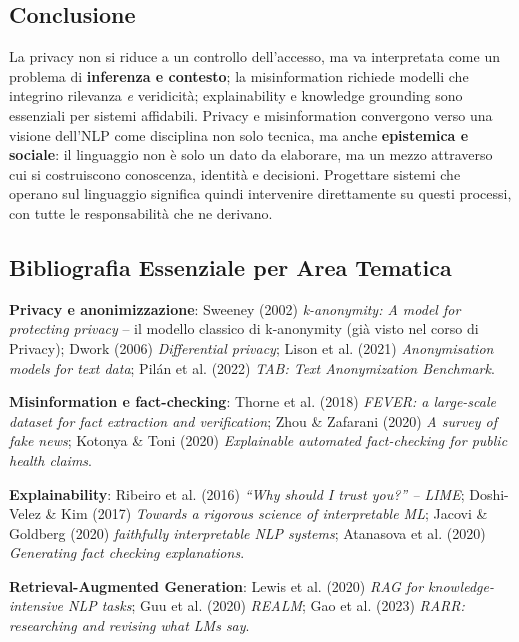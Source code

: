 \documentclass[12pt,a4paper]{article}
\begin{document}
\subsection{Conclusione}

\begin{quizbox}
La privacy non si riduce a un controllo dell'accesso, ma va interpretata come un problema di \textbf{inferenza e contesto}; la misinformation richiede modelli che integrino rilevanza \emph{e} veridicit\`a; explainability e knowledge grounding sono essenziali per sistemi affidabili. Privacy e misinformation convergono verso una visione dell'NLP come disciplina non solo tecnica, ma anche \textbf{epistemica e sociale}: il linguaggio non \`e solo un dato da elaborare, ma un mezzo attraverso cui si costruiscono conoscenza, identit\`a e decisioni. Progettare sistemi che operano sul linguaggio significa quindi intervenire direttamente su questi processi, con tutte le responsabilit\`a che ne derivano.
\end{quizbox}

\subsection{Bibliografia Essenziale per Area Tematica}

\textbf{Privacy e anonimizzazione}: Sweeney (2002) \emph{k-anonymity: A model for protecting privacy} -- il modello classico di k-anonymity (gi\`a visto nel corso di Privacy); Dwork (2006) \emph{Differential privacy}; Lison et al. (2021) \emph{Anonymisation models for text data}; Pil\'an et al. (2022) \emph{TAB: Text Anonymization Benchmark}.

\textbf{Misinformation e fact-checking}: Thorne et al. (2018) \emph{FEVER: a large-scale dataset for fact extraction and verification}; Zhou \& Zafarani (2020) \emph{A survey of fake news}; Kotonya \& Toni (2020) \emph{Explainable automated fact-checking for public health claims}.

\textbf{Explainability}: Ribeiro et al. (2016) \emph{``Why should I trust you?'' -- LIME}; Doshi-Velez \& Kim (2017) \emph{Towards a rigorous science of interpretable ML}; Jacovi \& Goldberg (2020) \emph{faithfully interpretable NLP systems}; Atanasova et al. (2020) \emph{Generating fact checking explanations}.

\textbf{Retrieval-Augmented Generation}: Lewis et al. (2020) \emph{RAG for knowledge-intensive NLP tasks}; Guu et al. (2020) \emph{REALM}; Gao et al. (2023) \emph{RARR: researching and revising what LMs say}.
\end{document}
